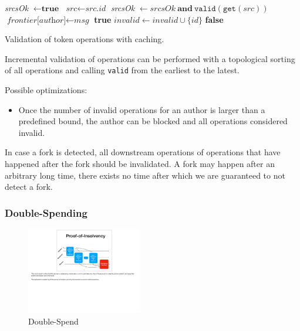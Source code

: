 \documentclass[sigplan,screen,10pt]{acmart}
\begin{document}
\begin{algorithm}
\begin{algorithmic}[1]
     \State
      \State \textit{srcsOk} $\leftarrow \textbf{true}$       
	     \State $\textit{src} \leftarrow \textit{src.id}$
	   \EndIf
	    \State \textit{srcsOk} $\leftarrow \textit{srcsOk} ~\textbf{and}~  \texttt{valid}(\texttt{get}(\textit{src}))$
           \EndFor
       \EndIf
       \State
           
              \State $\textit{frontier[author]} \leftarrow \textit{msg}$
          \EndIf
           \State \Return \textbf{true}
       \Else
            \State $\textit{invalid} \leftarrow \textit{invalid} \cup \{ id \}$
            \State \Return \textbf{false}
       \EndIf
   \EndProcedure
\end{algorithmic}
\caption{Validation of token operations with caching.}
\label{alg:validation}
\end{algorithm}

Incremental validation of operations can be performed with a topological sorting of all operations and calling \texttt{valid} from the earliest to the latest.


Possible optimizations: 
\begin{itemize}
    \item Once the number of invalid operations for an author is larger than a predefined bound, the author can be blocked and all operations considered invalid.
\end{itemize}

In case a fork is detected, all downstream operations of operations that have happened after the fork should be invalidated. A fork may happen after an arbitrary long time, there exists no time after which we are guaranteed to not detect a fork.

\subsubsection{Double-Spending}


\begin{figure}[hb]
\includegraphics[width=0.45\textwidth]{figures/double-spend}
\caption{Double-Spend}
\end{figure}
\end{document}

